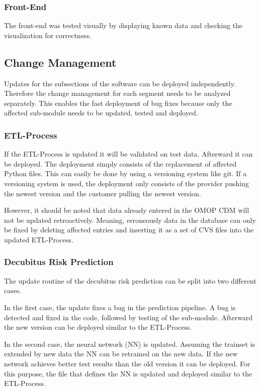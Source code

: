 \subsubsection{Front-End}
The front-end was tested visually by displaying known data and checking the visualization for correctness.


\subsection{Change Management}
Updates for the subsections of the software can be deployed independently.
Therefore the change management for each segment needs to be analyzed separately.
This enables the fast deployment of bug fixes because only the affected sub-module needs to be updated, tested and deployed. 

\subsubsection{ETL-Process}
If the ETL-Process is updated it will be validated on test data.
Afterward it can be deployed.
The deployment simply consists of the replacement of affected Python files.
This can easily be done by using a versioning system like git. 
If a versioning system is used, the deployment only consists of the provider pushing the newest version and the customer pulling the newest version.

However, it should be noted that data already entered in the OMOP CDM will not be updated retroactively.
Meaning, erroneously data in the database can only be fixed by deleting affected entries and inserting it as a set of CVS files into the updated ETL-Process.

\subsubsection{Decubitus Risk Prediction}
The update routine of the decubitus risk prediction can be split into two different cases.

In the first case, the update fixes a bug in the prediction pipeline. 
A bug is detected and fixed in the code, followed by testing of the sub-module.
Afterward the new version can be deployed similar to the ETL-Process.

In the second case, the neural network (NN) is updated.
Assuming the trainset is extended by new data the NN can be retrained on the new data.
If the new network achieves better test results than the old version it can be deployed.
For this purpose, the file that defines the NN is updated and deployed similar to the ETL-Process.


